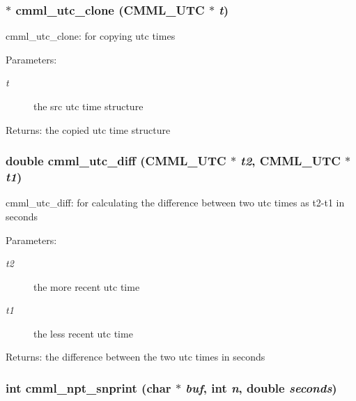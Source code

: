 \subsubsection{$\ast$ cmml\_\-utc\_\-clone ({\bf CMML\_\-UTC} $\ast$ {\em t})}\label{cmml_8h_a107}


cmml\_\-utc\_\-clone: for copying utc times

\begin{Desc}
\item[Parameters:]
\begin{description}
\item[{\em t}]the src utc time structure\end{description}
\end{Desc}
\begin{Desc}
\item[Returns:]the copied utc time structure \end{Desc}
\subsubsection{\setlength{\rightskip}{0pt plus 5cm}double cmml\_\-utc\_\-diff ({\bf CMML\_\-UTC} $\ast$ {\em t2}, {\bf CMML\_\-UTC} $\ast$ {\em t1})}\label{cmml_8h_a108}


cmml\_\-utc\_\-diff: for calculating the difference between two utc times as t2-t1 in seconds

\begin{Desc}
\item[Parameters:]
\begin{description}
\item[{\em t2}]the more recent utc time \item[{\em t1}]the less recent utc time\end{description}
\end{Desc}
\begin{Desc}
\item[Returns:]the difference between the two utc times in seconds \end{Desc}
\subsubsection{\setlength{\rightskip}{0pt plus 5cm}int cmml\_\-npt\_\-snprint (char $\ast$ {\em buf}, int {\em n}, double {\em seconds})}\label{cmml_8h_a109}


